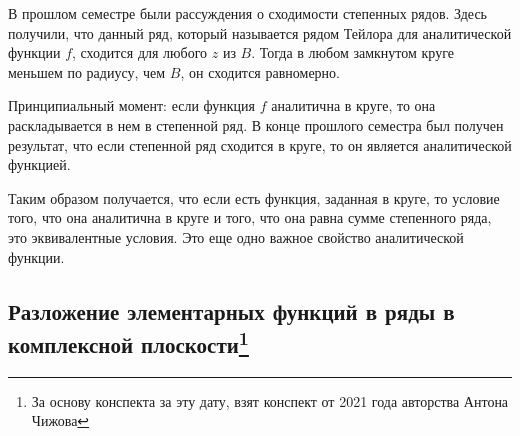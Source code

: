 \documentclass[main]{subfiles}
\begin{document}
\begin{remark}
    В прошлом семестре были рассуждения о сходимости степенных рядов.
    Здесь получили, что данный ряд, который называется рядом Тейлора для аналитической функции $f$, сходится для любого $z$ из $B$.
    Тогда в любом замкнутом круге меньшем по радиусу, чем $B$, он сходится равномерно.

    Принципиальный момент: если функция $f$ аналитична в круге, то она раскладывается в нем в степенной ряд.
    В конце прошлого семестра был получен результат, что если степенной ряд сходится в круге, то он является аналитической функцией.

    Таким образом получается, что если есть функция, заданная в круге, то условие того, что она аналитична в круге и того, что она равна сумме степенного ряда, это эквивалентные условия.
    Это еще одно важное свойство аналитической функции.
\end{remark}

\subsection[Разложение элементарных функций в ряды в комплексной плоскости]{Разложение элементарных функций в ряды в комплексной плоскости\footnote{За основу конспекта за эту дату, взят конспект от 2021 года авторства Антона Чижова}}
\end{document}
